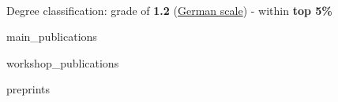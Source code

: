\documentclass[]{lukas-cv-openfont}
\begin{document}
\noindent
{}
\\
\begin{tightitemize}{1.7em}
    \item Degree classification: grade of \textbf{1.2} (\href{https://en.wikipedia.org/wiki/Academic_grading_in_Germany}{German scale}) - within \textbf{top 5\%}%
\end{tightitemize}

\largesectionsep


\noindent
{}
\vspace{-1.4em}
\begin{btSect}{main_publications}
    \btPrintNotCited
\end{btSect}
\sectionsep

\noindent
{}
\vspace{-1.4em}
\begin{btSect}{workshop_publications}
    \btPrintNotCited
\end{btSect}
\sectionsep

\noindent
{}
\vspace{-1.4em}
\begin{btSect}{preprints}
    \btPrintNotCited
\end{btSect}
\end{document}
